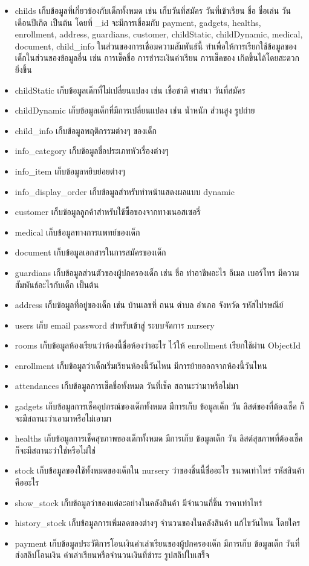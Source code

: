   \begin{itemize}
    \item childs เก็บข้อมูลที่เกี่ยวข้องกับเด็กทั้งหมด เช่น เก็บวันที่สมัคร วันที่เข้าเรียน ชื่อ ชื่อเล่น วันเดือนปีเกิด เป็นต้น  
    โดยที่ \_id จะมีการเชื่อมกับ payment, gadgets, healths, enrollment, address, guardians, customer, childStatic, childDynamic, medical, document, child\_info 
    ในส่วนของการเชื่อมความสัมพันธ์นี้ ทำเพื่อให้การเรียกใช้ข้อมูลของเด็กในส่วนของข้อมูลอื่น เช่น การเช็คชื่อ การชำระเงินค่าเรียน การเช็คของ เกิดขึ้นได้โดยสะดวกยิ่งขึ้น
    \item childStatic เก็บข้อมูลเด็กที่ไม่เปลี่ยนแปลง เช่น เชื้อชาติ ศาสนา วันที่สมัคร
    \item childDynamic เก็บข้อมูลเด็กที่มีการเปลี่ยนแปลง เช่น น้ำหนัก ส่วนสูง รูปถ่าย
    \item child\_info เก็บข้อมูลพฤติกรรมต่างๆ ของเด็ก
    \item info\_category เก็บข้อมูลชื่อประเภทหัวเรื่องต่างๆ
    \item info\_item เก็บข้อมูลหยิบย่อยต่างๆ
    \item info\_display\_order เก็บข้อมูลสำหรับทำหน้าแสดงผลแบบ dynamic
    \item customer เก็บข้อมูลลูกค้าสำหรับใช้ซื้อของจากทางเนอสเซอรี่
    \item medical เก็บข้อมูลทางการแพทย์ของเด็ก
    \item document เก็บข้อมูลเอกสารในการสมัครของเด็ก
    \item guardians เก็บข้อมูลส่วนตัวของผู้ปกครองเด็ก เช่น ชื่อ ทำอาชีพอะไร อีเมล เบอร์โทร มีความสัมพันธ์อะไรกับเด็ก เป็นต้น
    \item address เก็บข้อมูลที่อยู่ของเด็ก เช่น บ้านเลขที่ ถนน ตำบล อำเภอ จังหวัด รหัสไปรษณีย์ 
    \item users เก็บ email password สำหรับเข้าสู่ ระบบจัดการ nursery 
    \item rooms เก็บข้อมูลห้องเรียนว่าห้องนี้ชื่อห้องว่าอะไร ไว้ให้ enrollment เรียกใช้ผ่าน ObjectId
    \item enrollment เก็บข้อมูลว่าเด็กเริ่มเรียนห้องนี้วันไหน มีการย้ายออกจากห้องนี้วันไหน
    \item attendances เก็บข้อมูลการเช็คชื่อทั้งหมด วันที่เช็ค สถานะว่ามาหรือไม่มา
    \item gadgets เก็บข้อมูลการเช็คอุปกรณ์ของเด็กทั้งหมด มีการเก็บ ข้อมูลเด็ก วัน ลิสต์ของที่ต้องเช็ค ก็จะมีสถานะว่าเอามาหรือไม่เอามา
    \item healths เก็บข้อมูลการเช็คสุขภาพของเด็กทั้งหมด มีการเก็บ ข้อมูลเด็ก วัน ลิสต์สุขภาพที่ต้องเช็ค ก็จะมีสถานะว่าใช่หรือไม่ใช่
    \item stock เก็บข้อมูลของใช้ทั้งหมดของเด็กใน nursery ว่าของชิ้นนี้ชื่ออะไร ขนาดเท่าไหร่ รหัสสินค้าคืออะไร
    \item show\_stock เก็บข้อมูลว่าของแต่ละอย่างในคลังสินค้า มีจำนวนกี่ชิ้น ราคาเท่าไหร่
    \item history\_stock เก็บข้อมูลการเพิ่มลดของต่างๆ จำนวนของในคลังสินค้า แก้ไขวันไหน โดยใคร
    \item payment เก็บข้อมูลประวัติการโอนเงินค่าเล่าเรียนของผู้ปกครองเด็ก มีการเก็บ ข้อมูลเด็ก วันที่ส่งสลิปโอนเงิน ค่าเล่าเรียนหรือจำนวนเงินที่ชำระ รูปสลิปใบเสร็จ 
  \end{itemize}
